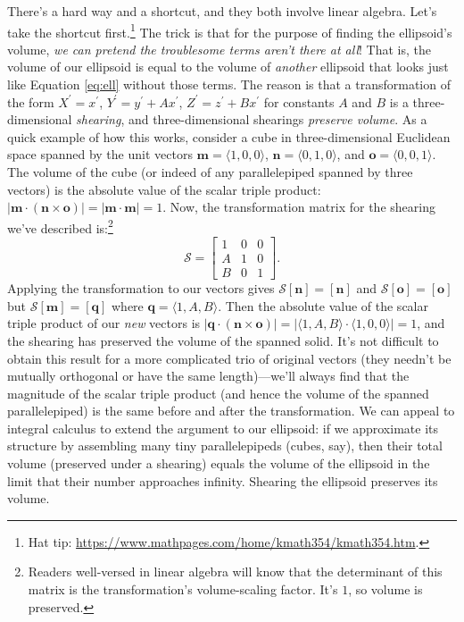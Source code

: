\documentclass[12pt]{article}
\renewcommand{\vv}[1]{\mathbf{#1}}
\begin{document}
There's a hard way and a shortcut, and they both involve linear algebra. Let's take the shortcut first.\footnote{Hat tip: \url{https://www.mathpages.com/home/kmath354/kmath354.htm}.} The trick is that for the purpose of finding the ellipsoid's volume, \emph{we can pretend the troublesome terms aren't there at all}! That is, the volume of our ellipsoid is equal to the volume of \emph{another} ellipsoid that looks just like Equation \ref{eq:ell} without those terms. The reason is that a transformation of the form $X^\prime = x^\prime$, $Y^\prime = y^\prime + A x^\prime$, $Z^\prime = z^\prime + B x^\prime$ for constants $A$ and $B$ is a three-dimensional \emph{shearing}, and three-dimensional shearings \emph{preserve volume}. As a quick example of how this works, consider a cube in three-dimensional Euclidean space spanned by the unit vectors $\vv m = \langle 1, 0, 0 \rangle$, $\vv n = \langle 0, 1, 0 \rangle$, and $\vv o = \langle 0, 0, 1 \rangle$. The volume of the cube (or indeed of any parallelepiped spanned by three vectors) is the absolute value of the scalar triple product: $| \vv m \cdot (\vv n \times \vv o ) | = | \vv m \cdot \vv m | = 1$. Now, the transformation matrix for the shearing we've described is:\footnote{Readers well-versed in linear algebra will know that the determinant of this matrix is the transformation's volume-scaling factor. It's $1$, so volume is preserved.}
\begin{equation*}
\mathcal{S} =
\begin{bmatrix}
1 & 0 & 0 \\
A & 1 & 0 \\
B & 0 & 1
\end{bmatrix}.
\end{equation*}
Applying the transformation to our vectors gives $\mathcal{S} [\vv n] = [\vv n]$ and $\mathcal{S} [\vv o] = [\vv o]$ but $\mathcal{S} [\vv m] = [ \vv q ]$ where $\vv q = \langle 1, A, B \rangle$. Then the absolute value of the scalar triple product of our \emph{new} vectors is ${| \vv q \cdot (\vv n \times \vv o) | = | \langle 1, A, B \rangle \cdot \langle 1, 0, 0 \rangle | = 1}$, and the shearing has preserved the volume of the spanned solid. It's not difficult to obtain this result for a more complicated trio of original vectors (they needn't be mutually orthogonal or have the same length)---we'll always find that the magnitude of the scalar triple product (and hence the volume of the spanned parallelepiped) is the same before and after the transformation. We can appeal to integral calculus to extend the argument to our ellipsoid: if we approximate its structure by assembling many tiny parallelepipeds (cubes, say), then their total volume (preserved under a shearing) equals the volume of the ellipsoid in the limit that their number approaches infinity. Shearing the ellipsoid preserves its volume.
\end{document}
